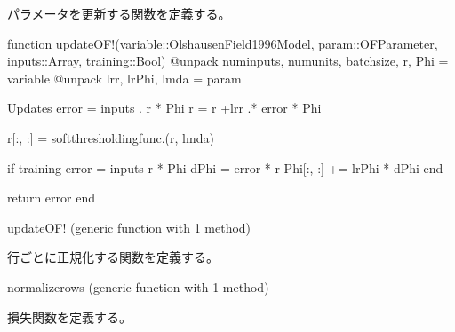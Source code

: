 \documentclass[letterpaper,10pt,english]{sphinxmanual}
\begin{document}
パラメータを更新する関数を定義する。

\begin{sphinxVerbatim}[commandchars=\\\{\}]
function updateOF!(variable::OlshausenField1996Model, param::OFParameter, inputs::Array, training::Bool)
    @unpack num\PYGZus{}inputs, num\PYGZus{}units, batch\PYGZus{}size, r, Phi = variable
    @unpack lr\PYGZus{}r, lr\PYGZus{}Phi, lmda = param

    \PYGZsh{} Updates                
    error = inputs .\PYGZhy{} r * Phi\PYGZsq{}
    r\PYGZus{} = r +lr\PYGZus{}r .* error * Phi

    r[:, :] = soft\PYGZus{}thresholding\PYGZus{}func.(r\PYGZus{}, lmda)

    if training 
        error = inputs \PYGZhy{} r * Phi\PYGZsq{}
        dPhi = error\PYGZsq{} * r
        Phi[:, :] += lr\PYGZus{}Phi * dPhi
    end
    
    return error
end
\end{sphinxVerbatim}

\begin{sphinxVerbatim}[commandchars=\\\{\}]
updateOF! (generic function with 1 method)
\end{sphinxVerbatim}

行ごとに正規化する関数を定義する。

\begin{sphinxVerbatim}[commandchars=\\\{\}]
 
          
\end{sphinxVerbatim}

\begin{sphinxVerbatim}[commandchars=\\\{\}]
normalize\PYGZus{}rows (generic function with 1 method)
\end{sphinxVerbatim}

損失関数を定義する。

\begin{sphinxVerbatim}[commandchars=\\\{\}]
   
      
       
       
\end{sphinxVerbatim}
\end{document}
